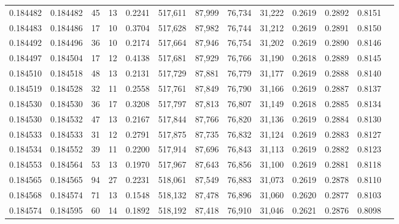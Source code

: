 \begin{tabular}{rrrrrrrrrrrrr}
0.184482 & 0.184482 &    45 &  13 &                                     0.2241 & 517,611 &  87,999 &  76,734 &  31,222 & 0.2619 & 0.2892 & 0.8151 \\
0.184483 & 0.184486 &    17 &  10 &                                     0.3704 & 517,628 &  87,982 &  76,744 &  31,212 & 0.2619 & 0.2891 & 0.8150 \\
0.184492 & 0.184496 &    36 &  10 &                                     0.2174 & 517,664 &  87,946 &  76,754 &  31,202 & 0.2619 & 0.2890 & 0.8146 \\
0.184497 & 0.184504 &    17 &  12 &                                     0.4138 & 517,681 &  87,929 &  76,766 &  31,190 & 0.2618 & 0.2889 & 0.8145 \\
0.184510 & 0.184518 &    48 &  13 &                                     0.2131 & 517,729 &  87,881 &  76,779 &  31,177 & 0.2619 & 0.2888 & 0.8140 \\
0.184519 & 0.184528 &    32 &  11 &                                     0.2558 & 517,761 &  87,849 &  76,790 &  31,166 & 0.2619 & 0.2887 & 0.8137 \\
0.184530 & 0.184530 &    36 &  17 &                                     0.3208 & 517,797 &  87,813 &  76,807 &  31,149 & 0.2618 & 0.2885 & 0.8134 \\
0.184530 & 0.184532 &    47 &  13 &                                     0.2167 & 517,844 &  87,766 &  76,820 &  31,136 & 0.2619 & 0.2884 & 0.8130 \\
0.184533 & 0.184533 &    31 &  12 &                                     0.2791 & 517,875 &  87,735 &  76,832 &  31,124 & 0.2619 & 0.2883 & 0.8127 \\
0.184534 & 0.184552 &    39 &  11 &                                     0.2200 & 517,914 &  87,696 &  76,843 &  31,113 & 0.2619 & 0.2882 & 0.8123 \\
0.184553 & 0.184564 &    53 &  13 &                                     0.1970 & 517,967 &  87,643 &  76,856 &  31,100 & 0.2619 & 0.2881 & 0.8118 \\
0.184565 & 0.184565 &    94 &  27 &                                     0.2231 & 518,061 &  87,549 &  76,883 &  31,073 & 0.2619 & 0.2878 & 0.8110 \\
0.184568 & 0.184574 &    71 &  13 &                                     0.1548 & 518,132 &  87,478 &  76,896 &  31,060 & 0.2620 & 0.2877 & 0.8103 \\
0.184574 & 0.184595 &    60 &  14 &                                     0.1892 & 518,192 &  87,418 &  76,910 &  31,046 & 0.2621 & 0.2876 & 0.8098 \\

\end{tabular}
